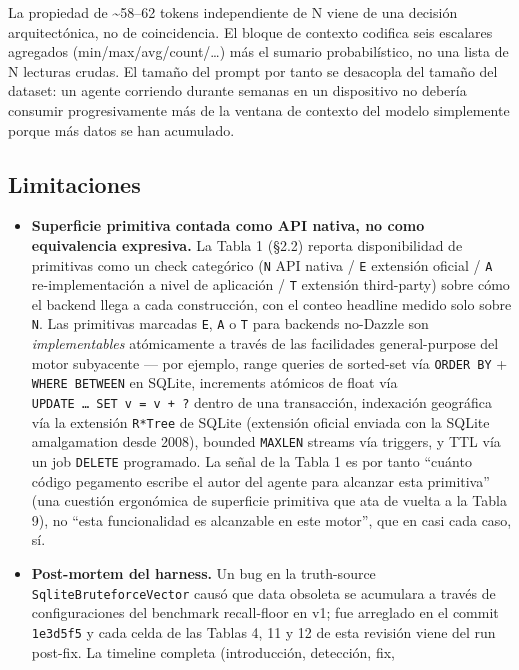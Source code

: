 La propiedad de \textasciitilde58--62 tokens independiente de N viene de una
decisión arquitectónica, no de coincidencia. El bloque de contexto codifica seis
escalares agregados (min/max/avg/count/\ldots) más el sumario probabilístico, no
una lista de N lecturas crudas. El tamaño del prompt por tanto se desacopla del
tamaño del dataset: un agente corriendo durante semanas en un dispositivo no
debería consumir progresivamente más de la ventana de contexto del modelo
simplemente porque más datos se han acumulado.

\subsection{Limitaciones}\label{limitaciones}

\begin{itemize}
\item
  \textbf{Superficie primitiva contada como API nativa, no como equivalencia
  expresiva.} La Tabla 1 (§2.2) reporta disponibilidad de primitivas como un
  check categórico (\texttt{N} API nativa / \texttt{E} extensión oficial /
  \texttt{A} re-implementación a nivel de aplicación / \texttt{T} extensión
  third-party) sobre cómo el backend llega a cada construcción, con el conteo
  headline medido solo sobre \texttt{N}. Las primitivas marcadas \texttt{E},
  \texttt{A} o \texttt{T} para backends no-Dazzle son \emph{implementables}
  atómicamente a través de las facilidades general-purpose del motor subyacente
  --- por ejemplo, range queries de sorted-set vía \texttt{ORDER\ BY} +
  \texttt{WHERE\ BETWEEN} en SQLite, increments atómicos de float vía
  \texttt{UPDATE\ …\ SET\ v\ =\ v\ +\ ?} dentro de una transacción, indexación
  geográfica vía la extensión \texttt{R*Tree} de SQLite (extensión oficial
  enviada con la SQLite amalgamation desde 2008), bounded \texttt{MAXLEN}
  streams vía triggers, y TTL vía un job \texttt{DELETE} programado. La señal de
  la Tabla 1 es por tanto ``cuánto código pegamento escribe el autor del agente
  para alcanzar esta primitiva'' (una cuestión ergonómica de superficie
  primitiva que ata de vuelta a la Tabla 9), no ``esta funcionalidad es
  alcanzable en este motor'', que en casi cada caso, sí.
\item
  \textbf{Post-mortem del harness.} Un bug en la truth-source
  \texttt{SqliteBruteforceVector} causó que data obsoleta se acumulara a través
  de configuraciones del benchmark recall-floor en v1; fue arreglado en el
  commit \texttt{1e3d5f5} y cada celda de las Tablas 4, 11 y 12 de esta revisión
  viene del run post-fix. La timeline completa (introducción, detección, fix,

\end{itemize}
